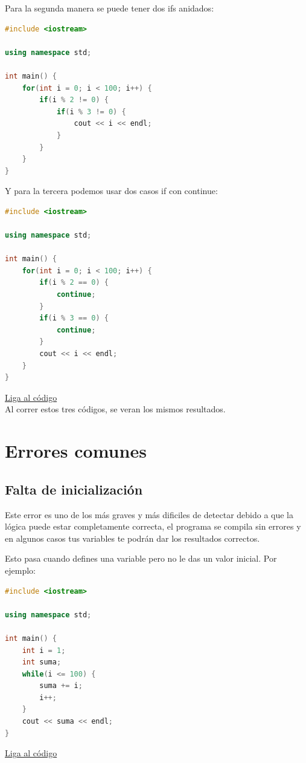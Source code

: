 \documentclass{article}
\begin{document}
Para la segunda manera se puede tener dos ifs anidados:

\begin{lstlisting}[language=C++, title=Dos condiciones]
#include <iostream>

using namespace std;

int main() {
	for(int i = 0; i < 100; i++) {
		if(i % 2 != 0) {
			if(i % 3 != 0) {
				cout << i << endl;
			}
		}
	}
}
\end{lstlisting}

Y para la tercera podemos usar dos casos if con continue:

\begin{lstlisting}[language=C++, title=Continue]
#include <iostream>

using namespace std;

int main() {
	for(int i = 0; i < 100; i++) {
		if(i % 2 == 0) {
			continue;
		}
		if(i % 3 == 0) {
			continue;
		}
		cout << i << endl;
	}
}
\end{lstlisting}
\href{https://repl.it/@Jamesscn/Numeros-no-hexagonales}{Liga al código}\\

Al correr estos tres códigos, se veran los mismos resultados.

\section{Errores comunes}

\subsection{Falta de inicialización}
Este error es uno de los más graves y más dificiles de detectar debido a que la lógica puede estar completamente correcta, el programa se compila sin errores y en algunos casos tus variables te podrán dar los resultados correctos.

Esto pasa cuando defines una variable pero no le das un valor inicial. Por ejemplo:

\begin{lstlisting}[language=C++, title=Error de inicialización]
#include <iostream>

using namespace std;

int main() {
	int i = 1;
	int suma;
	while(i <= 100) {
		suma += i;
		i++;
	}
	cout << suma << endl;
}
\end{lstlisting}
\href{https://repl.it/@Jamesscn/Suma-Imposible}{Liga al código}\\
\end{document}

